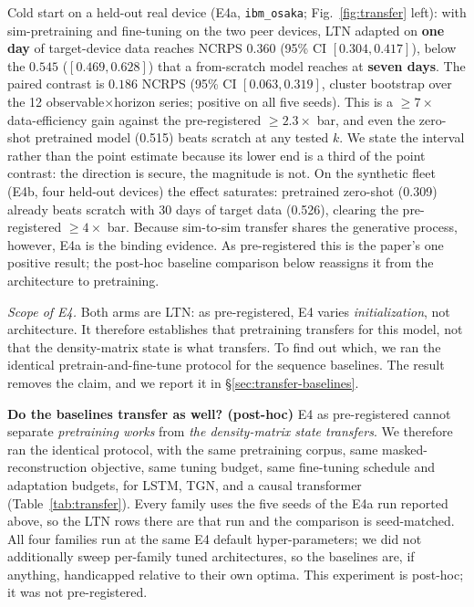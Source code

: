 \documentclass[journal]{IEEEtran}
\begin{document}
Cold start on a held-out real device (E4a, \texttt{ibm\_osaka};
Fig.~\ref{fig:transfer} left): with sim-pretraining and fine-tuning on the two
peer devices, LTN adapted on \textbf{one day} of target-device data reaches NCRPS
$0.360$ (95\% CI $[0.304, 0.417]$), below the $0.545$ ($[0.469, 0.628]$) that a
from-scratch model reaches at \textbf{seven days}. The paired contrast is $0.186$
NCRPS (95\% CI $[0.063, 0.319]$, cluster bootstrap over the 12
observable$\times$horizon series; positive on all five seeds). This is a
$\geq7\times$ data-efficiency gain against the pre-registered $\geq 2.3\times$
bar, and even the zero-shot pretrained model (0.515) beats scratch at any tested
$k$. We state the interval rather than the point estimate because its lower end is a
third of the point contrast: the direction is secure, the magnitude is not. On the synthetic fleet (E4b, four held-out devices) the effect saturates:
pretrained zero-shot (0.309) already beats scratch with 30 days of target
data (0.526), clearing the pre-registered $\geq 4\times$ bar. Because
sim-to-sim transfer shares the generative process, however, E4a is the binding
evidence. As pre-registered this is the paper's one positive result; the post-hoc
baseline comparison below reassigns it from the architecture to pretraining.

\emph{Scope of E4.} Both arms are LTN: as pre-registered, E4 varies
\emph{initialization}, not architecture. It therefore establishes that pretraining
transfers for this model, not that the density-matrix state is what transfers. To find
out which, we ran the identical pretrain-and-fine-tune protocol for the sequence
baselines. The result removes the claim, and we report it in
\S\ref{sec:transfer-baselines}.

\textbf{Do the baselines transfer as well? (post-hoc)}\label{sec:transfer-baselines}
E4 as pre-registered cannot separate \emph{pretraining works} from \emph{the density-matrix
state transfers}. We therefore ran the identical protocol, with the same pretraining
corpus, same masked-reconstruction objective, same tuning budget, same fine-tuning
schedule and adaptation budgets, for LSTM, TGN, and a causal transformer
(Table~\ref{tab:transfer}). Every family uses the five seeds of the E4a run
reported above, so the LTN rows there are that run and the comparison is
seed-matched. All four families run at the same E4 default
hyper-parameters; we did not additionally sweep per-family tuned architectures, so the
baselines are, if anything, handicapped relative to their own optima. This experiment
is post-hoc; it was not pre-registered.
\end{document}
